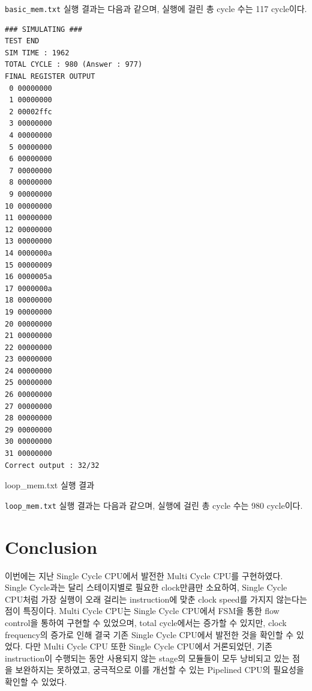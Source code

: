 \documentclass[openright, a4paper]{article}
\newenvironment{longlisting}{\captionsetup{type=listing}}{}
\newcommand{\code}[1]{\texttt{#1}}
\begin{document}
\hfill \break
\code{basic_mem.txt} 실행 결과는 다음과 같으며, 실행에 걸린 총 cycle 수는 
117 cycle이다.

\begin{longlisting}
    \begin{verbatim}
### SIMULATING ###
TEST END
SIM TIME : 1962
TOTAL CYCLE : 980 (Answer : 977)
FINAL REGISTER OUTPUT
 0 00000000
 1 00000000
 2 00002ffc
 3 00000000
 4 00000000
 5 00000000
 6 00000000
 7 00000000
 8 00000000
 9 00000000
10 00000000
11 00000000
12 00000000
13 00000000
14 0000000a
15 00000009
16 0000005a
17 0000000a
18 00000000
19 00000000
20 00000000
21 00000000
22 00000000
23 00000000
24 00000000
25 00000000
26 00000000
27 00000000
28 00000000
29 00000000
30 00000000
31 00000000
Correct output : 32/32
    \end{verbatim}
    \caption{loop_mem.txt 실행 결과}
\end{longlisting}

\hfill \break
\code{loop_mem.txt} 실행 결과는 다음과 같으며, 실행에 걸린 총 cycle 수는 980
cycle이다.

\section{Conclusion}

이번에는 지난 Single Cycle CPU에서 발전한 Multi Cycle CPU를 구현하였다.
Single Cycle과는 달리 스테이지별로 필요한 clock만큼만 소요하여, Single Cycle CPU처럼 가장 실행이 오래 걸리는 instruction에 맞춘 clock speed를 가지지 않는다는 점이 특징이다.
Multi Cycle CPU는 Single Cycle CPU에서 FSM을 통한 flow control을 통하여 구현할 수 있었으며, total cycle에서는 증가할 수 있지만, clock frequency의 증가로 인해 결국 기존 Single Cycle CPU에서 발전한 것을 확인할 수 있었다.
다만 Multi Cycle CPU 또한 Single Cycle CPU에서 거론되었던, 기존 instruction이 수행되는 동안 사용되지 않는 stage의 모듈들이 모두 낭비되고 있는 점을 보완하지는 못하였고, 궁극적으로 이를 개선할 수 있는 Pipelined CPU의 필요성을 확인할 수 있었다.
\end{document}
